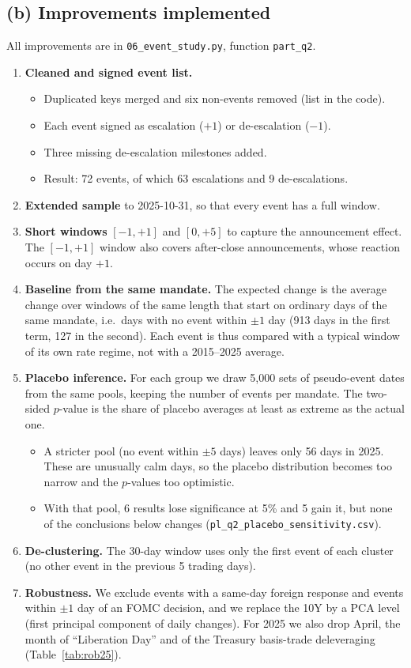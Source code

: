 \documentclass[11pt]{article}
\begin{document}
\subsection*{(b) Improvements implemented}
All improvements are in \nolinkurl{06_event_study.py}, function
\texttt{part\_q2}.
\begin{enumerate}[leftmargin=1.4em,itemsep=1pt]
\item \textbf{Cleaned and signed event list.}
\begin{itemize}[nosep]
\item Duplicated keys merged and six non-events removed (list in the code).
\item Each event signed as escalation ($+1$) or de-escalation ($-1$).
\item Three missing de-escalation milestones added.
\item Result: 72 events, of which 63 escalations and 9 de-escalations.
\end{itemize}
\item \textbf{Extended sample} to 2025-10-31, so that every event has a full
window.
\item \textbf{Short windows} $[-1,+1]$ and $[0,+5]$ to capture the
announcement effect. The $[-1,+1]$ window also covers after-close
announcements, whose reaction occurs on day $+1$.
\item \textbf{Baseline from the same mandate.} The expected change is the
average change over windows of the same length that start on ordinary days of
the same mandate, i.e.\ days with no event within $\pm1$ day (913 days in the
first term, 127 in the second). Each event is thus compared with a typical
window of its own rate regime, not with a 2015--2025 average.
\item \textbf{Placebo inference.} For each group we draw 5{,}000 sets of
pseudo-event dates from the same pools, keeping the number of events per
mandate. The two-sided $p$-value is the share of placebo averages at least as
extreme as the actual one.
\begin{itemize}[nosep]
\item A stricter pool (no event within $\pm5$ days) leaves only 56 days in
2025. These are unusually calm days, so the placebo distribution becomes too
narrow and the $p$-values too optimistic.
\item With that pool, 6 results lose significance at 5\% and 5 gain it, but
none of the conclusions below changes (\nolinkurl{pl_q2_placebo_sensitivity.csv}).
\end{itemize}
\item \textbf{De-clustering.} The 30-day window uses only the first event of
each cluster (no other event in the previous 5 trading days).
\item \textbf{Robustness.} We exclude events with a same-day foreign response
and events within $\pm1$ day of an FOMC decision, and we replace the 10Y by a
PCA level (first principal component of daily changes). For 2025 we also drop
April, the month of ``Liberation Day'' and of the Treasury basis-trade
deleveraging (Table~\ref{tab:rob25}).
\end{enumerate}
\end{document}
